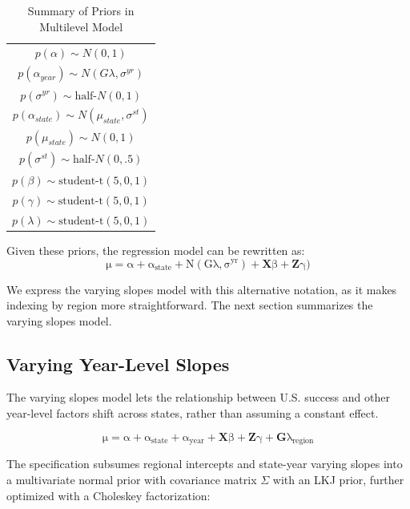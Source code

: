 \documentclass[12pt]{article}
\begin{document}
\begin{table} %
\begin{center}
\begin{tabular}{c} 
$ p(\alpha) \sim N(0, 1)$  \\
$ p(\alpha_{year}) \sim N(G \lambda, \sigma^{yr}) $ \\ 
$ p(\sigma^{yr}) \sim \mbox{half-}N(0, 1) $ \\
$ p(\alpha_{state}) \sim N(\mu_{state}, \sigma^{st}) $ \\ 
$ p(\mu_{state}) \sim N(0, 1) $ \\ 
$ p(\sigma^{st}) \sim \mbox{half-}N(0, .5) $ \\ 
$ p(\beta) \sim \mbox{student-t}(5, 0, 1) $ \\
$ p(\gamma) \sim \mbox{student-t}(5, 0, 1) $ \\
$ p(\lambda) \sim \mbox{student-t}(5, 0, 1) $ 
\end{tabular} 
\caption{Summary of Priors in Multilevel Model} 
\label{tab:priors}
\end{center} 
\end{table} 

Given these priors, the regression model can be rewritten as: 
\begin{equation}
\mathrm{ \mu = \alpha + \alpha_{state} + N(G \lambda, \sigma^{yr}) + \textbf{X} \beta + \textbf{Z} \gamma)}
\end{equation} 

We express the varying slopes model with this alternative notation, as it makes indexing by region more straightforward. The next section summarizes the varying slopes model. 

\subsection{Varying Year-Level Slopes} 

The varying slopes model lets the relationship between U.S. success and other year-level factors shift across states, rather than assuming a constant effect. 

\begin{equation}
\mathrm{ \mu = \alpha + \alpha_{state} + \alpha_{year} + \textbf{X} \beta + \textbf{Z} \gamma +  \textbf{G} \lambda_{region}} 
\end{equation} 

The specification subsumes regional intercepts and state-year varying slopes into a multivariate normal prior with covariance matrix $\Sigma$ with an LKJ prior, further optimized with a Choleskey factorization: 
\end{document}
